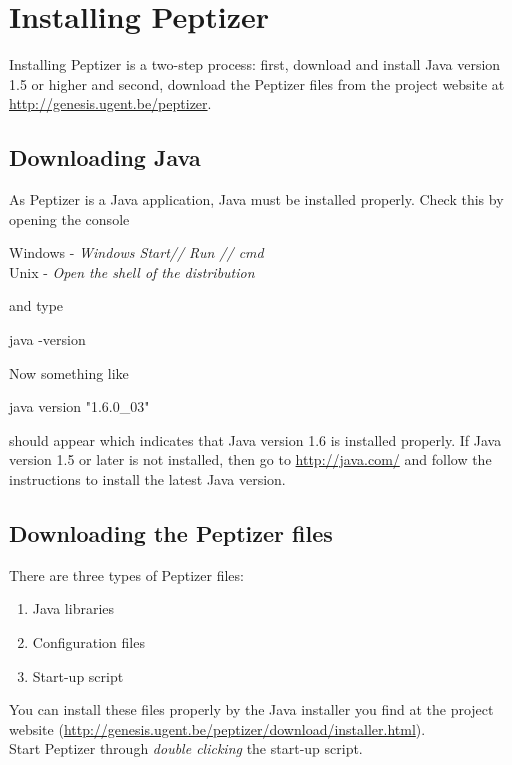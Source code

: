 \chapter{\label{installation}Installing Peptizer}
\npar
Installing Peptizer is a two-step process: first, download and install Java version 1.5 or higher and second, download the Peptizer files from the project website at \url{http://genesis.ugent.be/peptizer}.
\section{Downloading Java}
As Peptizer is a Java application, Java must be installed properly. Check this by opening the console
%
\begin{center}
Windows   -   \textit{Windows Start// Run // cmd}\\
Unix   -   \textit{Open the shell of the distribution}
\end{center}
%
and type
%
\begin{center}
java -version
\end{center}
%
Now something like
%
\begin{center}
java version "1.6.0\_03"
\end{center}
%
should appear which indicates that Java version 1.6 is installed properly. If Java version 1.5 or later is not installed, then go to \url{http://java.com/} and follow the instructions to install the latest Java version.\\
\section{Downloading the Peptizer files}
There are three types of Peptizer files:
\begin{enumerate}
	\item Java libraries
	\item Configuration files 
	\item Start-up script
\end{enumerate}
%
\npar You can install these files properly by the Java installer you find at the project website (\url{http://genesis.ugent.be/peptizer/download/installer.html}).\\ Start Peptizer through \textit{double clicking }the start-up script.
\npar 

